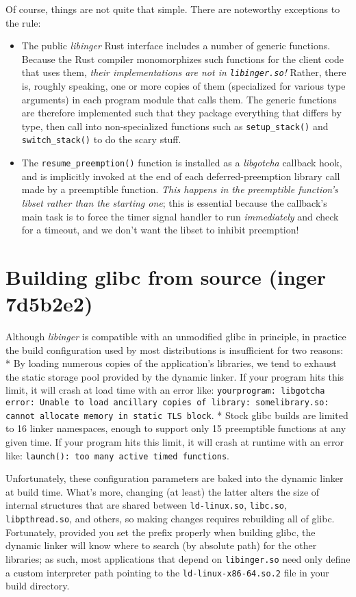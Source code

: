 \documentclass[12pt,letterpaper,openright]{report}
\begin{document}
Of course, things are not quite that simple.  There are noteworthy exceptions to the rule:
\begin{itemize}
\item The public \textit{libinger} Rust interface includes a number of generic functions.  Because the Rust
	compiler monomorphizes such functions for the client code that uses them, \textit{their implementations
	are \textrm{not} in \texttt{libinger.so}!}  Rather, there is, roughly speaking, one or more copies of them
	(specialized for various type arguments) in each program module that calls them.  The generic
	functions are therefore implemented such that they package everything that differs by type, then
	call into non-specialized functions such as \texttt{setup\_stack()} and \texttt{switch\_stack()} to do the scary
	stuff.
\item The \texttt{resume\_preemption()} function is installed as a \textit{libgotcha} callback hook, and is implicitly
	invoked at the end of each deferred-preemption library call made by a preemptible function.
	\textit{This happens in the preemptible function's libset rather than the starting one}; this is
	essential because the callback's main task is to force the timer signal handler to run
	\textit{immediately} and check for a timeout, and we don't want the libset to inhibit preemption!
\end{itemize}


\section{Building glibc from source (inger 7d5b2e2)}

Although \textit{libinger} is compatible with an unmodified glibc in principle, in practice the build
configuration used by most distributions is insufficient for two reasons:
 * By loading numerous copies of the application's libraries, we tend to exhaust the static storage
   pool provided by the dynamic linker.  If your program hits this limit, it will crash at load time
   with an error like: \texttt{yourprogram: libgotcha error: Unable to load ancillary copies of library:
   somelibrary.so: cannot allocate memory in static TLS block}.
 * Stock glibc builds are limited to 16 linker namespaces, enough to support only 15 preemptible
   functions at any given time.  If your program hits this limit, it will crash at runtime with an
   error like: \texttt{launch(): too many active timed functions}.

Unfortunately, these configuration parameters are baked into the dynamic linker at build time.
What's more, changing (at least) the latter alters the size of internal structures that are shared
between \texttt{ld-linux.so}, \texttt{libc.so}, \texttt{libpthread.so}, and others, so making changes requires rebuilding
all of glibc.  Fortunately, provided you set the prefix properly when building glibc, the dynamic
linker will know where to search (by absolute path) for the other libraries; as such, most
applications that depend on \texttt{libinger.so} need only define a custom interpreter path pointing to the
\texttt{ld-linux-x86-64.so.2} file in your build directory.
\end{document}
